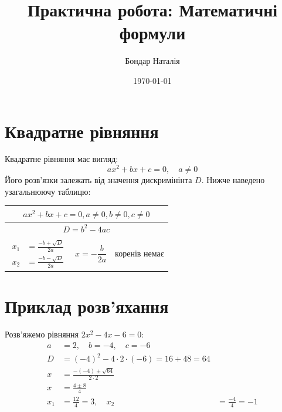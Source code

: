 \documentclass[12pt]{article}  %
\title{Практична робота: Математичні формули}
\author{Бондар Наталія}
\date{\today}
\begin{document}

\maketitle %
\section*{Квадратне рівняння}

Квадратне рівняння має вигляд:
\begin{equation}
ax^2 + bx +c = 0, \quad a \neq 0
\end{equation}
Його розв'язки залежать від значення дискримінінта $D$. Нижче наведено узагальнюючу таблицю:
\begin{table}[h]
\centering
\renewcommand{\arraystretch}{3}
\begin{tabular}{|c|c|c|}
\hline
\multicolumn{3}{|c|}{$ax^2 + bx + c = 0, a \neq 0, b \neq 0, c \neq 0$}\\ \hline
\multicolumn{3}{|c|}{$D = b^2 - 4ac$}\\ \hline
$\begin{aligned}
    x_1 &= \frac{-b + \sqrt{D}}{2a} \\
    x_2 &= \frac{-b - \sqrt{D}}{2a}
\end{aligned}$ &
$x = -\dfrac{b}{2a}$ &
коренів немає \\ \hline
\end{tabular}
\end{table}
\section*{Приклад розв'яхання}
Розв'яжемо рівняння $2x^2 - 4x - 6 = 0$:
\begin{align*}
a &= 2, \quad b = -4, \quad c = -6\\
D &= (-4)^2 - 4 \cdot 2 \cdot (-6) = 16 + 48 = 64\\
x &= \frac{-(-4)\pm \sqrt{64}}{2 \cdot 2} \\
x &=\frac{4 \pm 8}{4} \\
x_1 &= \frac{12}{4} = 3, \quad x_2 &= \frac{-4}{4} = -1
\end{align*}
\end{document}
